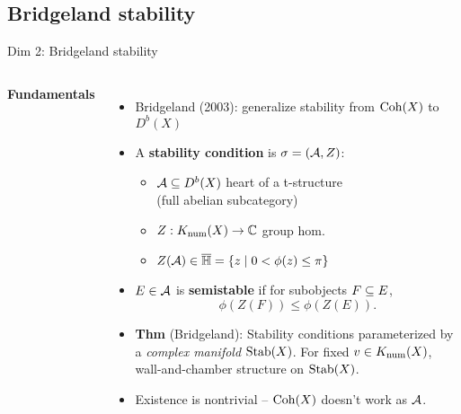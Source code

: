 \documentclass[8pt,handout]{beamer} %
\begin{document}
\subsection{Bridgeland stability}
\begin{frame}{Dim 2: Bridgeland stability}
    \begin{columns}[t]
        \textbf{Fundamentals}
        \begin{itemize}
            \item<3-> Bridgeland (2003): generalize stability from $\mathrm{Coh}(X)$ to $D^b(X)$
            \item<4-> A \textbf{stability condition} is $\sigma = (\mathcal{A}, Z)$:
            \begin{itemize}
                \item<5-> $\mathcal{A} \subseteq D^b(X)$ heart of a t-structure \\
                \qquad\qquad (full abelian subcategory)
                \item<6-> $Z: K_{\mathrm{num}}(X) \to \mathbb{C}$ group hom.
                \item<7-> $Z(\mathcal{A}) \in \overline{\mathbb{H}} = \{ z \;|\; 0 < \phi(z) \le \pi \}$
            \end{itemize}
            \item<8-> $E \in \mathcal{A}$ is \textbf{semistable} if for subobjects $F \subseteq E$,
            \[ \phi(Z(F)) \le \phi(Z(E)). \]
            \item<9-> \textbf{Thm} (Bridgeland): Stability conditions parameterized by a \textit{complex manifold} $\operatorname{\mathrm{Stab}}(X)$. For fixed $v \in K_{\mathrm{num}}(X)$, wall-and-chamber structure on $\operatorname{\mathrm{Stab}}(X)$.
            \item<11-> Existence is nontrivial -- $\mathrm{Coh}(X)$ doesn't work as $\mathcal{A}$.
        \end{itemize}
        

\end{columns}
\end{frame}
\end{document}
